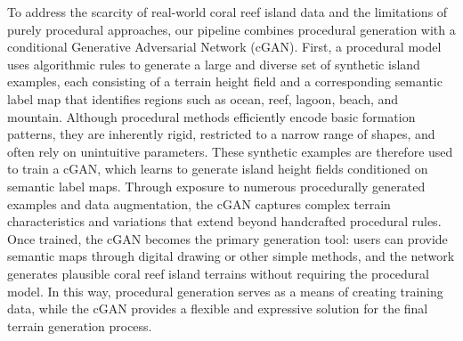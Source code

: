 

To address the scarcity of real-world coral reef island data and the limitations of purely procedural approaches, our pipeline combines procedural generation with a conditional Generative Adversarial Network (cGAN). First, a procedural model uses algorithmic rules to generate a large and diverse set of synthetic island examples, each consisting of a terrain height field and a corresponding semantic label map that identifies regions such as ocean, reef, lagoon, beach, and mountain. Although procedural methods efficiently encode basic formation patterns, they are inherently rigid, restricted to a narrow range of shapes, and often rely on unintuitive parameters. These synthetic examples are therefore used to train a cGAN, which learns to generate island height fields conditioned on semantic label maps. Through exposure to numerous procedurally generated examples and data augmentation, the cGAN captures complex terrain characteristics and variations that extend beyond handcrafted procedural rules. Once trained, the cGAN becomes the primary generation tool: users can provide semantic maps through digital drawing or other simple methods, and the network generates plausible coral reef island terrains without requiring the procedural model. In this way, procedural generation serves as a means of creating training data, while the cGAN provides a flexible and expressive solution for the final terrain generation process.



